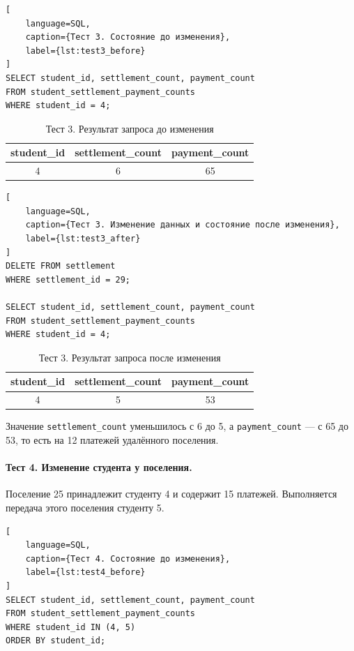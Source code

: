 \begin{lstlisting}[
    language=SQL,
    caption={Тест 3. Состояние до изменения},
    label={lst:test3_before}
]
SELECT student_id, settlement_count, payment_count
FROM student_settlement_payment_counts
WHERE student_id = 4;
\end{lstlisting}

\begin{table}[H]
\centering
\caption{Тест 3. Результат запроса до изменения}
\label{tab:test3_before}
\small
\begin{tabular}{|c|c|c|}
\hline
\textbf{student\_id} & \textbf{settlement\_count} & \textbf{payment\_count} \\ \hline
4 & 6 & 65 \\ \hline
\end{tabular}
\end{table}

\begin{lstlisting}[
    language=SQL,
    caption={Тест 3. Изменение данных и состояние после изменения},
    label={lst:test3_after}
]
DELETE FROM settlement
WHERE settlement_id = 29;

SELECT student_id, settlement_count, payment_count
FROM student_settlement_payment_counts
WHERE student_id = 4;
\end{lstlisting}

\begin{table}[H]
\centering
\caption{Тест 3. Результат запроса после изменения}
\label{tab:test3_after}
\small
\begin{tabular}{|c|c|c|}
\hline
\textbf{student\_id} & \textbf{settlement\_count} & \textbf{payment\_count} \\ \hline
4 & 5 & 53 \\ \hline
\end{tabular}
\end{table}

Значение \texttt{settlement\_count} уменьшилось с 6 до 5, а \texttt{payment\_count} --- с 65 до 53, то есть на 12 платежей удалённого поселения.

\paragraph{Тест 4. Изменение студента у поселения.}
Поселение 25 принадлежит студенту 4 и содержит 15 платежей. Выполняется передача этого поселения студенту 5.

\begin{lstlisting}[
    language=SQL,
    caption={Тест 4. Состояние до изменения},
    label={lst:test4_before}
]
SELECT student_id, settlement_count, payment_count
FROM student_settlement_payment_counts
WHERE student_id IN (4, 5)
ORDER BY student_id;
\end{lstlisting}

